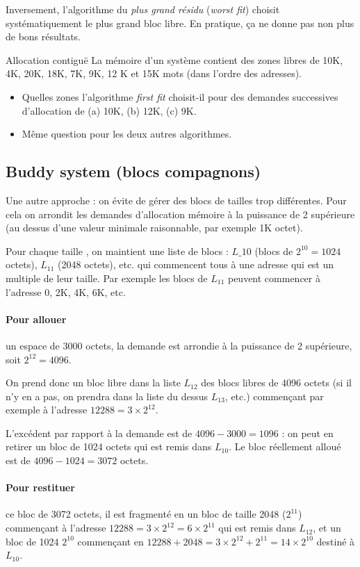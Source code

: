 \begin{multicols}{2}
Inversement, l'algorithme du \emph{plus grand résidu} (\emph{worst
  fit}) choisit systématiquement le plus grand bloc libre.  En
pratique, ça ne donne pas non plus de bons résultats.

\begin{exercice}{Allocation contiguë}
La mémoire d'un système contient des zones libres de 10K, 4K, 20K,
18K, 7K, 9K, 12 K et 15K mots (dans l'ordre des adresses).
\begin{itemize}
\item Quelles zones l'algorithme \emph{first fit} choisit-il pour des
  demandes successives d'allocation de (a) 10K, (b) 12K, (c) 9K.
\item
Même question pour les deux autres algorithmes.
\end{itemize}
\end{exercice}

\subsection{Buddy system (blocs compagnons)}

Une autre approche : on évite de gérer des blocs de tailles trop
différentes. Pour cela on arrondit les demandes d'allocation mémoire à
la puissance de 2 supérieure (au dessus d'une valeur minimale
raisonnable, par exemple 1K octet).


Pour chaque taille , on maintient une liste de blocs : $L\_{10}$ 
(blocs de
$2^{10}=1024$ octets), $L_{11}$ (2048 octets), etc. qui commencent tous à
une adresse qui est un multiple de leur taille.  Par exemple les blocs
de $L_{11}$ peuvent commencer à l'adresse 0, 2K, 4K, 6K, etc.

\paragraph{Pour allouer} un espace de 3000 octets, la demande est 
arrondie à la puissance de 2 supérieure,
soit $2^{12} = 4096$.
 
On prend donc un bloc libre dans la liste $L_{12}$ des blocs libres de
4096 octets (si il n'y en a pas, on prendra dans la liste du dessus
$L_{13}$, etc.) commençant par exemple à l'adresse $12288 = 3 \times
2^{12}$.

L'excédent par rapport à la demande est de $4096-3000 = 1096$ : on
peut en retirer un bloc de 1024 octets qui est remis dans $L_{10}$. Le
bloc réellement alloué est de $4096 - 1024 = 3072$ octets.

\paragraph{Pour restituer} ce bloc de 3072 octets, il est fragmenté 
en un bloc de taille 
2048 ($2^{11}$) commençant à l'adresse $12288 = 3 \times 2^{12} = 6
\times 2^{11}$ qui est remis dans $L_{12}$, et un bloc de 1024
$2^{10}$ commençant en $12288 + 2048 = 3 \times 2^{12} + 2^{11} = 14
\times 2^{10}$ destiné à $L_{10}$.


\end{multicols}
